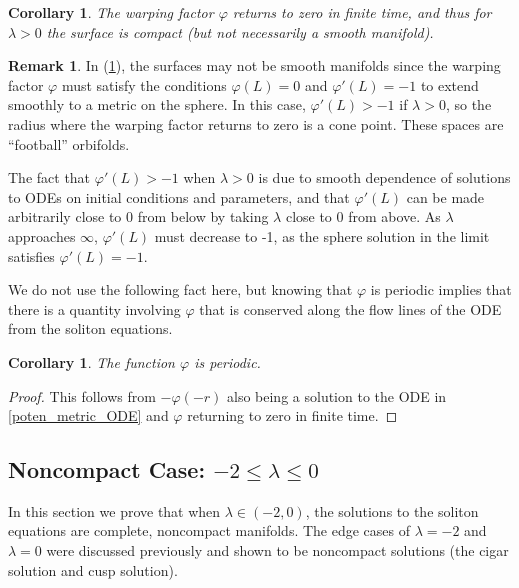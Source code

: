 \documentclass[12pt, a4paper, reqno, oneside]{amsart}
\renewcommand{\phi}{\varphi}
\numberwithin{equation}{section}
\theoremstyle{plain}
\newtheorem{corollary}[theorem]{Corollary}
\theoremstyle{definition}
\newtheorem{remark}[theorem]{Remark}
\theoremstyle{plain}
\begin{document}
\begin{corollary}\label{compact_cor}
  The warping factor $\varphi$ returns to zero in finite time, and thus for $\lambda>0$ the surface is compact (but not necessarily a smooth manifold).
\end{corollary}
 
\begin{remark}
  In (\ref{compact_cor}), the surfaces may not be smooth manifolds since the warping factor $\varphi$ must satisfy the conditions $\varphi(L)=0$ and $\varphi'(L)=-1$ to extend smoothly to a metric on the sphere. In this case, $\varphi'(L)>-1$ if $\lambda>0$, so the radius where the warping factor returns to zero is a cone point. These spaces are ``football'' orbifolds.

  The fact that $\varphi'(L)>-1$ when $\lambda>0$ is due to smooth dependence of solutions to ODEs on initial conditions and parameters, and that $\varphi'(L)$ can be made arbitrarily close to 0 from below by taking $\lambda$ close to 0 from above. As $\lambda$ approaches $\infty$, $\varphi'(L)$ must decrease to -1, as the sphere solution in the limit satisfies $\varphi'(L)=-1$.
\end{remark}

We do not use the following fact here, but knowing that $\phi$ is periodic implies that there is a quantity involving $\phi$ that is conserved along the flow lines of the ODE from the soliton equations.

\begin{corollary}
  The function $\phi$ is periodic.
\end{corollary}
\begin{proof}
  This follows from $-\phi(-r)$ also being a solution to the ODE in \ref{poten_metric_ODE} and $\phi$ returning to zero in finite time.
\end{proof}

\subsection{Noncompact Case: \texorpdfstring{$-2\leq\lambda\leq0$}{Lambda Negative}}
In this section we prove that when $\lambda\in(-2,0)$, the solutions to the soliton equations are complete, noncompact manifolds. The edge cases of $\lambda=-2$ and $\lambda=0$ were discussed previously and shown to be noncompact solutions (the cigar solution and cusp solution).
\end{document}
